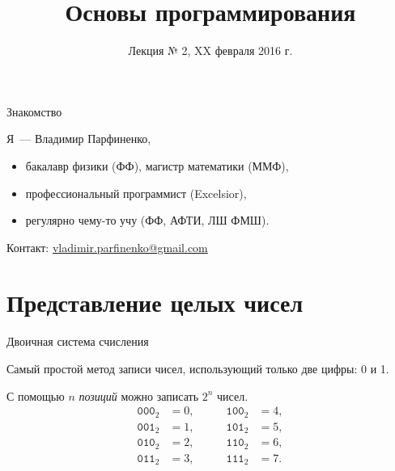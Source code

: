 \documentclass{beamer}
\title{Основы программирования}
\subtitle{Лекция № 2, XX февраля 2016 г.}
\date{}
\institute{
  \vspace{1em}
  \centering
  \parbox{0.8\textwidth}{
    \texttt{[image: xkcd\_cant\_sleep]}
    \par
    \raggedleft\tiny\url{http://xkcd.com/571}
  }
}
\newcommand{\pcnum}[1]{\ensuremath{\mathtt{#1}}}
\newcommand{\bin}[1]{\pcnum{#1}_2}
\begin{document}
\begin{frame}[plain]
  \titlepage
\end{frame}

\begin{frame}{Знакомство}

  Я~--- Владимир Парфиненко,

  \begin{itemize}
    \item бакалавр физики (ФФ), магистр математики (ММФ),
    \item профессиональный программист (Excelsior),
    \item регулярно чему-то учу (ФФ, АФТИ, ЛШ ФМШ).
  \end{itemize}

  Контакт:
  \href{mailto:vladimir.parfinenko@gmail.com}{vladimir.parfinenko@gmail.com}

\end{frame}

\section{Представление целых чисел}

\begin{frame}{Двоичная система счисления}

  Самый простой метод записи чисел, использующий только две цифры: 0 и 1.

  С помощью $n$ \emph{позиций} можно записать $2^n$ чисел.
  \begin{align*}
    \bin{000} &= 0, &\qquad \bin{100} &= 4, \\
    \bin{001} &= 1, &\qquad \bin{101} &= 5, \\
    \bin{010} &= 2, &\qquad \bin{110} &= 6, \\
    \bin{011} &= 3, &\qquad \bin{111} &= 7.
  \end{align*}
\end{frame}
\end{document}
